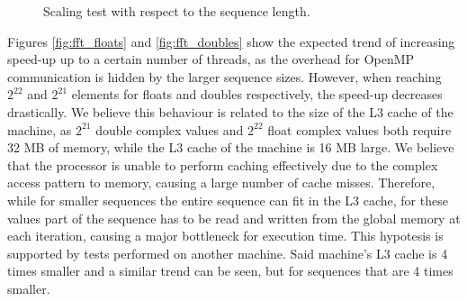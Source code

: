 \begin{figure}[ht]
    \centering
    \caption{Scaling test with respect to the sequence length.}
    \label{fig:fft_performance}
\end{figure}

Figures \ref{fig:fft_floats} and \ref{fig:fft_doubles} show the expected trend of increasing speed-up up to a certain number of threads, as the overhead for OpenMP communication is hidden by the larger sequence sizes. However, when reaching $2^{22}$ and $2^{21}$ elements for floats and doubles respectively, the speed-up decreases drastically. We believe this behaviour is related to the size of the L3 cache of the machine, as $2^{21}$ double complex values and $2^{22}$ float complex values both require 32 MB of memory, while the L3 cache of the machine is 16 MB large. We believe that the processor is unable to perform caching effectively due to the complex access pattern to memory, causing a large number of cache misses. Therefore, while for smaller sequences the entire sequence can fit in the L3 cache, for these values part of the sequence has to be read and written from the global memory at each iteration, causing a major bottleneck for execution time. This hypotesis is supported by tests performed on another machine. Said machine's L3 cache is 4 times smaller and a similar trend can be seen, but for sequences that are 4 times smaller.